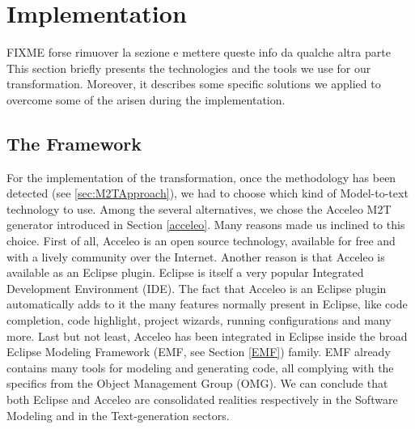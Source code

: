\section{Implementation}
\label{sec:implementation}
FIXME forse rimuover la sezione e mettere queste info da qualche altra parte \\
This section briefly presents the technologies and the tools we use for our transformation. Moreover, it describes some specific solutions we applied to overcome some of the arisen during the implementation.

\subsection{The Framework}
\label{framework}
For the implementation of the transformation, once the methodology has been detected (see \ref{sec:M2TApproach}), we had to choose which kind of Model-to-text technology to use. Among the several alternatives, we chose the Acceleo M2T generator introduced in Section \ref{acceleo}.
Many reasons made us inclined to this choice. 
First of all, Acceleo is an open source technology, available for free and with a lively community over the Internet. Another reason is that Acceleo is available as an Eclipse plugin. Eclipse is itself a very popular Integrated Development Environment (IDE). The fact that Acceleo is an Eclipse plugin automatically adds to it the many features normally present in Eclipse, like code completion, code highlight, project wizards, running configurations and many more. 
Last but not least, Acceleo has been integrated in Eclipse inside the broad Eclipse Modeling Framework (EMF, see Section \ref{EMF}) family. EMF already contains many tools for modeling and generating code, all complying with the specifics from the Object Management Group (OMG).
We can conclude that both Eclipse and Acceleo are consolidated realities respectively in the Software Modeling and in the Text-generation sectors. 